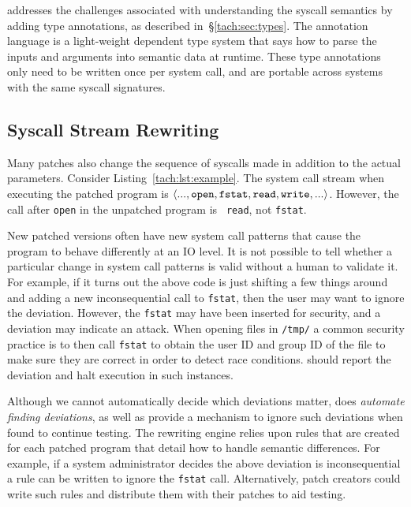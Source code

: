 \tachyon addresses the challenges associated with understanding the
syscall semantics by adding type annotations, as described in~\S\ref{tach:sec:types}. The \tachyon 
annotation language is a light-weight dependent type system that says
how to parse the inputs and arguments into semantic data at runtime.
These type annotations only need to be written once per system call,
and are portable across systems with the same syscall signatures.

\subsection{Syscall Stream Rewriting}


Many patches also change the sequence of syscalls made in addition to
the actual parameters.  Consider Listing~\ref{tach:lst:example}.  The
system call stream when executing the patched program is $\langle ...,
{\tt open}, {\tt fstat}, {\tt read}, {\tt write}, ...\rangle$.
However, the call after {\tt open}  in the unpatched program is {\tt
  read}, not {\tt fstat}.  




New patched versions often have new system call patterns that cause
the program to behave differently at an IO level. It is not possible
to tell whether a particular change in system call patterns is valid
without a human to validate it. For example, if it turns out the
above code is just shifting a few things around and adding a new
inconsequential call to \texttt{fstat}, then the user may want to
ignore the deviation.  However, the \texttt{fstat} may have been
inserted for security, and a deviation may indicate an attack.  When
opening files in \texttt{/tmp/} a common security practice is to
then call \texttt{fstat} to obtain the user ID and group ID of the
file to make sure they are correct in order to detect race
conditions. \tachyon should report the deviation and halt execution in
such instances. 

Although we cannot automatically decide which deviations matter,
\tachyon does \emph{automate finding deviations}, as well as provide a
mechanism to ignore such deviations when found to continue testing.
The rewriting engine relies upon rules that are created for each
patched program that detail how to handle semantic differences. For
example, if a system administrator decides the above deviation is
inconsequential a rule can be written to ignore the {\tt fstat} call.
Alternatively, patch creators could write such rules and distribute
them with their patches to aid testing.

